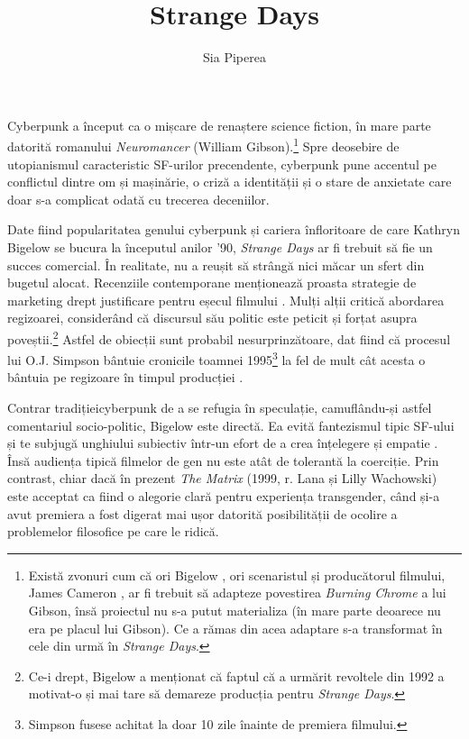 \documentclass[12pt]{article}
\title{Strange Days}
\author{Sia Piperea}
\begin{document}
	 	
	\maketitle
		 	
	Cyberpunk a început ca o mișcare de renaștere science fiction, în mare parte datorită romanului \textit{Neuromancer} (William Gibson).\footnote{Există zvonuri cum că ori Bigelow \parencite{Salza1994a}, ori scenaristul și producătorul filmului, James Cameron \parencite{Henry2023a}, ar fi trebuit să adapteze povestirea \textit{Burning Chrome} a lui Gibson, însă proiectul nu s-a putut materializa (în mare parte deoarece nu era pe placul lui Gibson). Ce a rămas din acea adaptare s-a transformat în cele din urmă în \textit{Strange Days}.} Spre deosebire de utopianismul caracteristic SF-urilor precendente, cyberpunk pune accentul pe conflictul dintre om și mașinărie, o criză a identității și o stare de anxietate care doar s-a complicat odată cu trecerea deceniilor.\par
	
	Date fiind popularitatea genului cyberpunk și cariera înfloritoare de care Kathryn Bigelow se bucura la începutul anilor '90, \textit{Strange Days} ar fi trebuit să fie un succes comercial. În realitate, nu a reușit să strângă nici măcar un sfert din bugetul alocat. Recenziile contemporane menționează proasta strategie de marketing drept justificare pentru eșecul filmului \parencite{McCarthy1995a}. Mulți alții critică abordarea regizoarei, considerând că discursul său politic este peticit și forțat asupra poveștii.\footnote{Ce-i drept, Bigelow a menționat că faptul că a urmărit revoltele din 1992 a motivat-o și mai tare să demareze producția pentru \textit{Strange Days}.} Astfel de obiecții sunt probabil nesurprinzătoare, dat fiind că procesul lui O.J. Simpson bântuie cronicile toamnei 1995\footnote{Simpson fusese achitat la doar 10 zile înainte de premiera filmului.} la fel de mult cât acesta o bântuia pe regizoare în timpul producției \parencite{Willistein1995a}.\par
	
	Contrar \dedouble tradiției\sqtworight cyberpunk de a se refugia în speculație, camuflându-și astfel comentariul socio-politic, Bigelow este directă. Ea evită fantezismul tipic SF-ului și te subjugă unghiului subiectiv într-un efort de a crea înțelegere și empatie \parencite{Ebert1995a}. Însă audiența tipică filmelor de gen nu este atât de tolerantă la coerciție. Prin contrast, chiar dacă în prezent \textit{The Matrix} (1999, r. Lana și Lilly Wachowski) este acceptat ca fiind o alegorie clară pentru experiența transgender, când și-a avut premiera a fost digerat mai ușor datorită posibilității de ocolire a problemelor filosofice pe care le ridică.\par 
	
\end{document}
